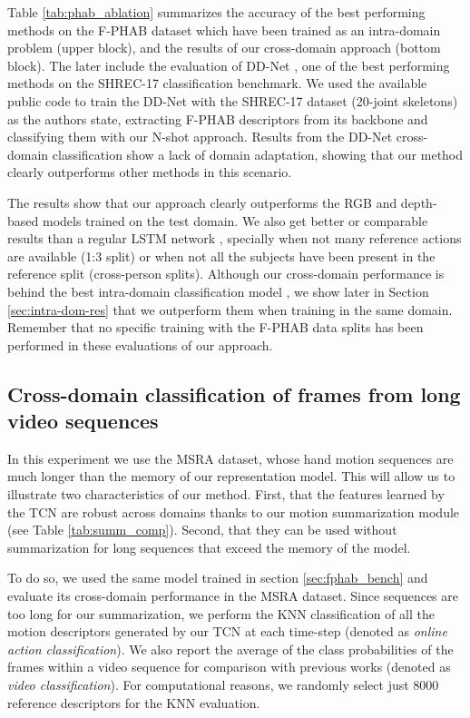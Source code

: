\documentclass[letterpaper, 10 pt, conference]{ieeeconf}
\begin{document}
Table \ref{tab:phab_ablation} summarizes the accuracy of the best performing methods on the F-PHAB dataset which have been trained as an intra-domain problem (upper block), and the results of our cross-domain approach (bottom block). The later include the evaluation of DD-Net \cite{yang2019make}, one of the best performing methods on the SHREC-17 classification benchmark. We used the available public code to  train the DD-Net with the SHREC-17 dataset (20-joint skeletons) as the authors state, extracting F-PHAB descriptors from its backbone and classifying them with our N-shot approach. 
Results from the DD-Net cross-domain classification show a lack of domain adaptation, showing that our method clearly outperforms other methods in this scenario.

The results show that our approach clearly outperforms the  RGB \cite{feichtenhofer2016convolutional} and depth-based \cite{oreifej2013hon4d} models trained on the test domain.
We also get better or comparable results than a regular LSTM network \cite{zhu2016co}, specially when not many reference actions are available (1:3 split) or when not all the subjects have been present in the reference split (cross-person splits). 
Although our cross-domain performance is behind the best intra-domain classification model \cite{zhang2016efficient}, we show later in Section \ref{sec:intra-dom-res} that we outperform them when training in the same domain.  Remember that no specific training with the F-PHAB data splits has been performed in these evaluations of our approach.




\subsection{Cross-domain classification of frames from long video sequences}

In this experiment we use the MSRA dataset, whose hand motion sequences are much longer than the memory of our representation model. This will allow us to illustrate two characteristics of our method. First, that the features learned by the TCN are robust across domains thanks to our motion summarization module (see Table \ref{tab:summ_comp}). Second, that they can be used without summarization for long sequences that exceed the memory of the model.

To do so, we used the same model trained in section \ref{sec:fphab_bench} and evaluate its cross-domain performance in the MSRA dataset. Since sequences are too long for our summarization, we  perform the KNN classification of all the motion descriptors generated by our TCN at each time-step (denoted as \textit{online action classification}). We also report the average of the class probabilities of the frames within a video sequence for comparison with previous works (denoted as \textit{video classification}). For computational reasons, we randomly select just 8000 reference descriptors for the KNN evaluation. 
\end{document}
